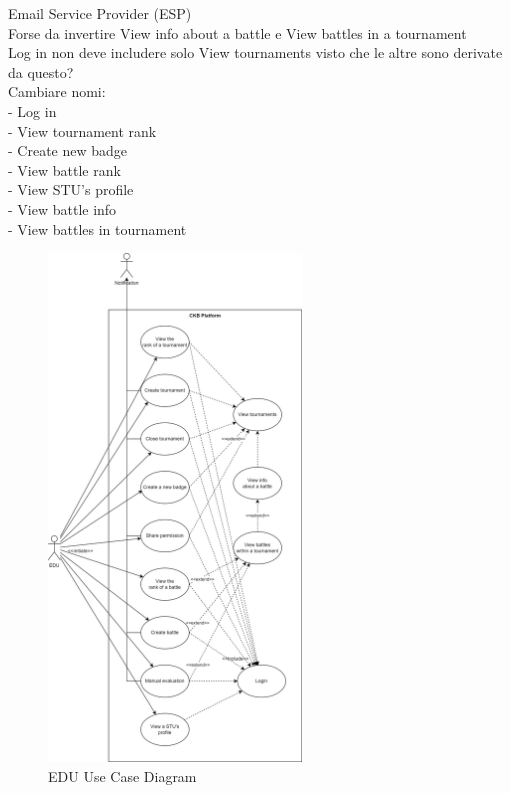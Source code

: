 {\color{red} 
        Email Service Provider (ESP) \\
        Forse da invertire View info about a battle e View battles in a tournament\\
        Log in non deve includere solo View tournaments visto che le altre sono derivate da questo?\\
        Cambiare nomi: \\
        - Log in \\
        - View tournament rank \\
        - Create new badge \\
        - View battle rank \\
        - View STU's profile \\
        - View battle info \\
        - View battles in tournament \\ 
}
\begin{figure}[H]
    \centering
    \includegraphics[width=0.6\textwidth]{images/sequence_diagrams/use_case_diagrams_EDU.png}
    \caption{EDU Use Case Diagram}
\end{figure}


